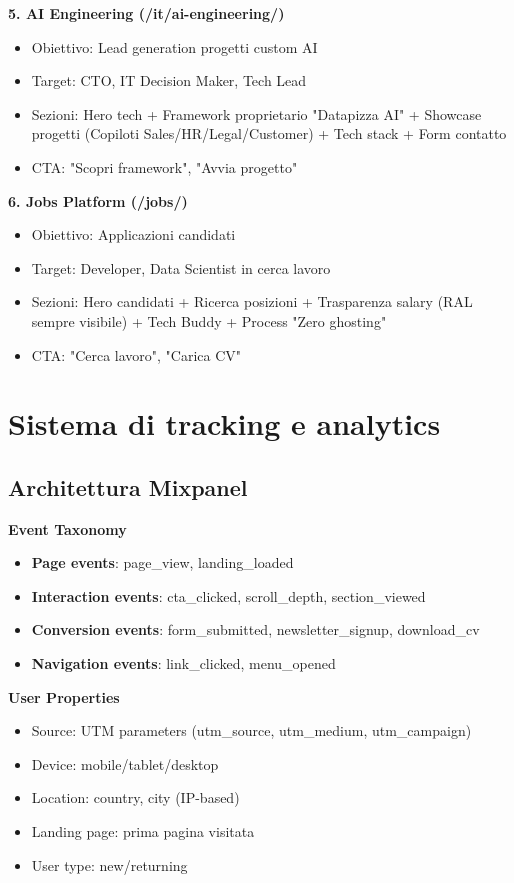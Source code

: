 \textbf{5. AI Engineering (/it/ai-engineering/)}
\begin{itemize}
  \item Obiettivo: Lead generation progetti custom AI
  \item Target: CTO, IT Decision Maker, Tech Lead
  \item Sezioni: Hero tech + Framework proprietario "Datapizza AI" + 
        Showcase progetti (Copiloti Sales/HR/Legal/Customer) + 
        Tech stack + Form contatto
  \item CTA: "Scopri framework", "Avvia progetto"
\end{itemize}

\textbf{6. Jobs Platform (/jobs/)}
\begin{itemize}
  \item Obiettivo: Applicazioni candidati
  \item Target: Developer, Data Scientist in cerca lavoro
  \item Sezioni: Hero candidati + Ricerca posizioni + Trasparenza 
        salary (RAL sempre visibile) + Tech Buddy + Process 
        "Zero ghosting"
  \item CTA: "Cerca lavoro", "Carica CV"
\end{itemize}

\section{Sistema di tracking e analytics}
\subsection{Architettura Mixpanel}
\textbf{Event Taxonomy}
\begin{itemize}
  \item \textbf{Page events}: page\_view, landing\_loaded
  \item \textbf{Interaction events}: cta\_clicked, scroll\_depth, 
        section\_viewed
  \item \textbf{Conversion events}: form\_submitted, newsletter\_signup, 
        download\_cv
  \item \textbf{Navigation events}: link\_clicked, menu\_opened
\end{itemize}

\textbf{User Properties}
\begin{itemize}
  \item Source: UTM parameters (utm\_source, utm\_medium, utm\_campaign)
  \item Device: mobile/tablet/desktop
  \item Location: country, city (IP-based)
  \item Landing page: prima pagina visitata
  \item User type: new/returning
\end{itemize}


